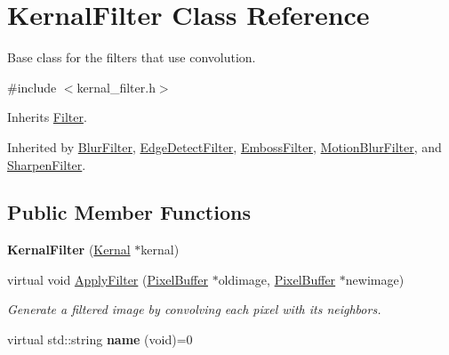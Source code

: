\hypertarget{classKernalFilter}{}\section{Kernal\+Filter Class Reference}
\label{classKernalFilter}


Base class for the filters that use convolution.  




{\ttfamily \#include $<$kernal\+\_\+filter.\+h$>$}



Inherits \hyperlink{classFilter}{Filter}.



Inherited by \hyperlink{classBlurFilter}{Blur\+Filter}, \hyperlink{classEdgeDetectFilter}{Edge\+Detect\+Filter}, \hyperlink{classEmbossFilter}{Emboss\+Filter}, \hyperlink{classMotionBlurFilter}{Motion\+Blur\+Filter}, and \hyperlink{classSharpenFilter}{Sharpen\+Filter}.

\subsection*{Public Member Functions}
\begin{DoxyCompactItemize}
\item 
{\bfseries Kernal\+Filter} (\hyperlink{classKernal}{Kernal} $\ast$kernal)\hypertarget{classKernalFilter_a0ac54d2441b5c10dab12dd1209c120ea}{}\label{classKernalFilter_a0ac54d2441b5c10dab12dd1209c120ea}

\item 
virtual void \hyperlink{classKernalFilter_a26e481e4042dcacd0ceb7e6c9416c127}{Apply\+Filter} (\hyperlink{classimage__tools_1_1PixelBuffer}{Pixel\+Buffer} $\ast$oldimage, \hyperlink{classimage__tools_1_1PixelBuffer}{Pixel\+Buffer} $\ast$newimage)
\begin{DoxyCompactList}\small\item\em Generate a filtered image by convolving each pixel with its neighbors. \end{DoxyCompactList}\item 
virtual std\+::string {\bfseries name} (void)=0\hypertarget{classKernalFilter_a3cab4050cdcdc8d858a2ad933a5b950e}{}\label{classKernalFilter_a3cab4050cdcdc8d858a2ad933a5b950e}

\end{DoxyCompactItemize}
